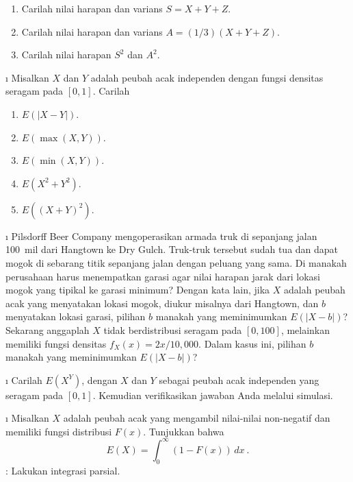 {\begin{LJSItem}
\begin{enumerate}
\item Carilah nilai harapan dan varians $S = X + Y + Z$.

\item Carilah nilai harapan dan varians $A = (1/3)(X + Y + Z)$.

\item Carilah nilai harapan $S^2$ dan $A^2$.
\end{enumerate}

\i\label{exer 6.3.12} Misalkan $X$ dan $Y$ adalah peubah acak independen dengan
fungsi densitas seragam pada $[0,1]$. Carilah

\begin{enumerate}
\item $E(|X - Y|)$.

\item $E(\max(X,Y))$.

\item $E(\min(X,Y))$.

\item $E(X^2 + Y^2)$.

\item $E((X + Y)^2)$.
\end{enumerate}

\i\label{exer 6.3.13} Pilsdorff Beer Company
mengoperasikan armada truk di sepanjang jalan 100~mil dari Hangtown
ke Dry Gulch. Truk-truk tersebut sudah tua dan dapat mogok di
sebarang titik sepanjang jalan dengan peluang yang sama. Di manakah perusahaan harus
menempatkan garasi agar nilai harapan jarak dari lokasi mogok yang tipikal ke garasi
minimum? Dengan kata lain, jika $X$ adalah peubah acak yang menyatakan lokasi mogok,
diukur misalnya dari Hangtown, dan $b$ menyatakan lokasi garasi, pilihan $b$ manakah
yang meminimumkan $E(|X - b|)$? Sekarang anggaplah $X$ tidak berdistribusi seragam
pada $[0,100]$, melainkan memiliki fungsi densitas $f_X(x) = 2x/10{,}000$. Dalam
kasus ini, pilihan $b$ manakah yang meminimumkan $E(|X - b|)$?

\i\label{exer 6.3.14} Carilah $E(X^Y)$, dengan $X$ dan $Y$ sebagai peubah acak
independen yang seragam pada $[0, 1]$. Kemudian verifikasikan jawaban Anda melalui
simulasi.

\i\label{exer 6.3.15} Misalkan $X$ adalah peubah acak yang mengambil nilai-nilai
non-negatif dan memiliki fungsi distribusi $F(x)$. Tunjukkan bahwa
$$ E(X) = \int_0^\infty (1 - F(x))\, dx\ .
$$ 
 : Lakukan integrasi parsial.


\end{LJSItem}}

